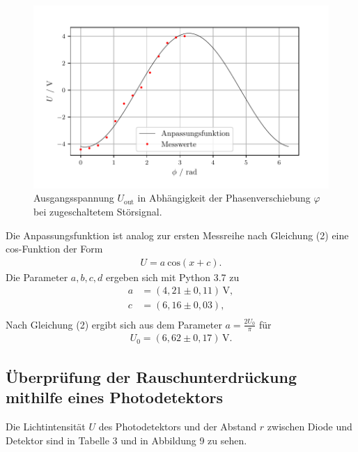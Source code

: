 \begin{figure}[H]
  \centering
  \includegraphics{plot2.pdf}
  \caption{Ausgangsspannung $U_\text{out}$ in Abhängigkeit der Phasenverschiebung $\varphi$
  bei zugeschaltetem Störsignal.}
\end{figure}

Die Anpassungsfunktion ist analog zur ersten Messreihe nach Gleichung (2) eine cos-Funktion der Form
\begin{align*}
U = a\:\text{cos} (x + c).
\end{align*}
Die Parameter $a,b,c,d$ ergeben sich mit Python 3.7 zu
\begin{align*}
a &= (4,21 \pm 0,11)\,\si{\volt}, \\
c &= (6,16 \pm 0,03), \\
\end{align*}
Nach Gleichung (2) ergibt sich aus dem Parameter $a = \frac{2 U_\text{0}}{\pi}$ für
\begin{align*} 
U_\text{0} = (6,62 \pm 0,17)\,\si{\volt}.
\end{align*}

\subsection{Überprüfung der Rauschunterdrückung mithilfe eines Photodetektors}
Die Lichtintensität $U$ des Photodetektors und der Abstand $r$ zwischen Diode und Detektor
sind in Tabelle 3 und in Abbildung 9 zu sehen.

